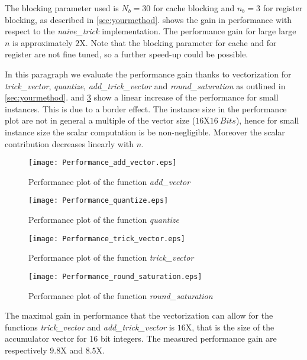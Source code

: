 The blocking parameter used is $N_b = 30$ for cache blocking  and $n_b = 3$ for register blocking, as described in \cref{sec:yourmethod}.  shows the gain in performance with respect to the \emph{naive\_trick} implementation. The performance gain for large  large $n$ is approximately $2$X. Note that the blocking parameter for cache and for register are not fine tuned, so a further speed-up could be possible.


In this paragraph we evaluate the performance gain thanks to vectorization for \emph{trick\_vector}, \emph{quantize}, \emph{add\_trick\_vector} and \emph{round\_saturation} as outlined in \cref{sec:yourmethod}.  and \cref{figure:performance_trick_vector} show a linear increase of the performance for small instances. This is due to a border effect. The instance size in the  performance plot are not in general a multiple of the vector size ($16$X$16 \ Bits$), hence for small instance size the scalar computation is be non-negligible. Moreover the scalar contribution decreases linearly with $n$.

\begin{figure}[h]
\texttt{[image: Performance\_add\_vector.eps]}
\caption{Performance plot of the function \emph{add\_vector}}
\label{figure:performance_add_vector}
\end{figure}

\begin{figure}[h]
	\texttt{[image: Performance\_quantize.eps]}
	\caption{Performance plot of the function \emph{quantize}}
	\label{figure:performance_quantize}
\end{figure}

\begin{figure}[h]
\texttt{[image: Performance\_trick\_vector.eps]}
\caption{Performance plot of the function \emph{trick\_vector}}
\label{figure:performance_trick_vector}
\end{figure}

\begin{figure}[h]
\texttt{[image: Performance\_round\_saturation.eps]}
\caption{Performance plot of the function \emph{round\_saturation}}
\label{figure:performance_round_saturation}
\end{figure}

The maximal gain in performance that the vectorization can allow for the functions \emph{trick\_vector} and \emph{add\_trick\_vector} is $16$X, that is the size of the accumulator vector for 16 bit integers. The measured performance gain are respectively  $9.8$X and $8.5$X.

